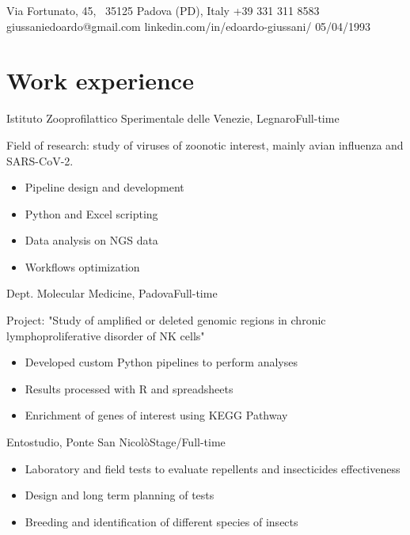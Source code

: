 \documentclass{fancy_cv}
\author{Edoardo Giussani}
\begin{document}
    {Via Fortunato, 45, \ 35125 Padova (PD), Italy}
    {+39 331 311 8583}
    {giussaniedoardo@gmail.com}
    {linkedin.com/in/edoardo-giussani/}
    {05/04/1993}


    \section{Work experience}
        {Istituto Zooprofilattico Sperimentale delle Venezie, Legnaro}{Full-time}
        {Field of research: study of viruses of zoonotic interest, mainly avian influenza and SARS-CoV-2.
        \begin{itemize}
            \item Pipeline design and development
            \item Python and Excel scripting
            \item Data analysis on NGS data
            \item Workflows optimization 
        \end{itemize}}
        \medskip

        {Dept. Molecular Medicine, Padova}{Full-time}
        {Project: "Study of amplified or deleted genomic regions in chronic 
        lymphoproliferative disorder of NK cells"
        \begin{itemize}
            \item Developed custom Python pipelines to perform analyses
            \item Results processed with R and spreadsheets
            \item Enrichment of genes of interest using KEGG Pathway
        \end{itemize}}
        \medskip

            {Entostudio, Ponte San Nicolò}{Stage/Full-time}
            {\begin{itemize}
                \item Laboratory and field tests to evaluate repellents and insecticides effectiveness 
                \item Design and long term planning of tests
                \item Breeding and identification of different species of insects
            \end{itemize}}
\end{document}
